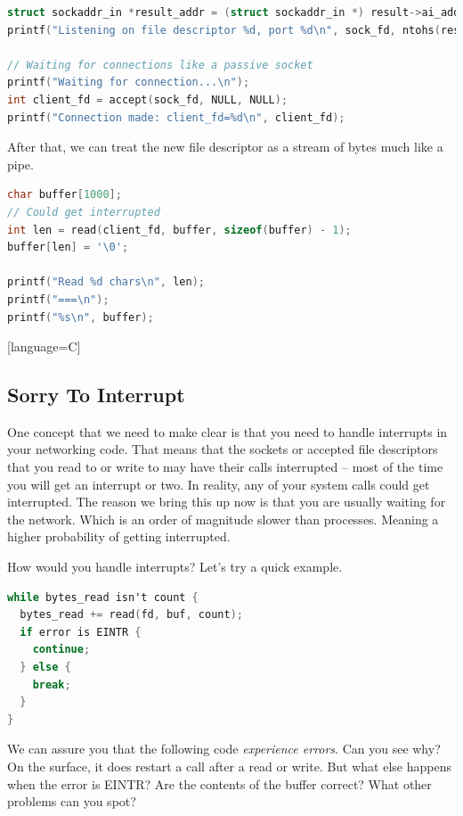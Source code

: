 \begin{lstlisting}[language=C]
struct sockaddr_in *result_addr = (struct sockaddr_in *) result->ai_addr;
printf("Listening on file descriptor %d, port %d\n", sock_fd, ntohs(result_addr->sin_port));

// Waiting for connections like a passive socket
printf("Waiting for connection...\n");
int client_fd = accept(sock_fd, NULL, NULL);
printf("Connection made: client_fd=%d\n", client_fd);
\end{lstlisting}

After that, we can treat the new file descriptor as a stream of bytes much like a pipe.

\begin{lstlisting}[language=C]
char buffer[1000];
// Could get interrupted
int len = read(client_fd, buffer, sizeof(buffer) - 1);
buffer[len] = '\0';

printf("Read %d chars\n", len);
printf("===\n");
printf("%s\n", buffer);
\end{lstlisting}[language=C]

\subsection{Sorry To Interrupt}

One concept that we need to make clear is that you need to handle interrupts in your networking code.
That means that the sockets or accepted file descriptors that you read to or write to may have their calls interrupted -- most of the time you will get an interrupt or two.
In reality, any of your system calls could get interrupted.
The reason we bring this up now is that you are usually waiting for the network.
Which is an order of magnitude slower than processes.
Meaning a higher probability of getting interrupted.

How would you handle interrupts?
Let's try a quick example.

\begin{lstlisting}[language=C]
while bytes_read isn't count {
  bytes_read += read(fd, buf, count);
  if error is EINTR {
    continue;
  } else {
    break;
  }
}
\end{lstlisting}

We can assure you that the following code \textit{experience errors}.
Can you see why?
On the surface, it does restart a call after a read or write.
But what else happens when the error is EINTR?
Are the contents of the buffer correct?
What other problems can you spot?

